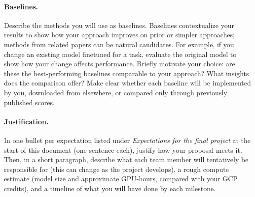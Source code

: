 \documentclass{article}
\newcommand{\note}[1]{#1}
\begin{document}
    \paragraph{Baselines.}
        \note{Describe the methods you will use as baselines. Baselines contextualize your results to show how your approach improves on prior or simpler approaches; methods from related papers can be natural candidates. For example, if you change an existing model finetuned for a task, evaluate the original model to show how your change affects performance. Briefly motivate your choice: are these the best-performing baselines comparable to your approach? What insights does the comparison offer? Make clear whether each baseline will be implemented by you, downloaded from elsewhere, or compared only through previously published scores.}

    \paragraph{Justification.}
        \note{In one bullet per expectation listed under \emph{Expectations for the final project} at the start of this document (one sentence each), justify how your proposal meets it. Then, in a short paragraph, describe what each team member will tentatively be responsible for (this can change as the project develops), a rough compute estimate (model size and approximate GPU-hours, compared with your GCP credits), and a timeline of what you will have done by each milestone.}

    
    
\end{document}
